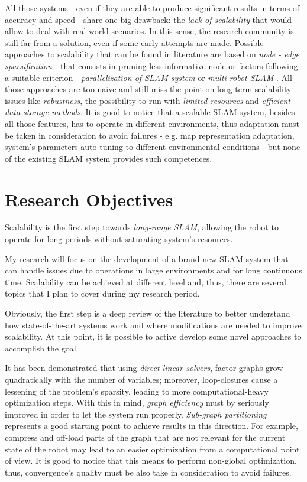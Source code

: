 \documentclass[10pt,a4paper, notitlepage]{report}
\begin{document}
All those systems - even if they are able to produce significant results in terms of accuracy and speed - share one big drawback: the \textit{lack of scalability} that would allow to deal with real-world scenarios. In this sense, the research community is still far from a solution, even if some early attempts are made. Possible approaches to scalability that can be found in literature are based on \textit{node - edge sparsification} \cite{kretzschmar2011graph-pruninig} \cite{huang2013consistent} - that consists in pruning less informative node or factors following a suitable criterion - \textit{parallelization of SLAM system} \cite{ni-dallaert2010nested-dissections} \cite{ni-dallaert2007tectonicSAM} \cite{grisetti2010hogman} or \textit{multi-robot SLAM} \cite{cunningham2013ddfSAM2} \cite{lazaro2013mr-slam}. All those approaches are too naive and still miss the point on long-term scalability issues like \textit{robustness}, the possibility to run with \textit{limited resources} and \textit{efficient data storage methods}. It is good to notice that a scalable SLAM system, besides all those features, has to operate in different environments, thus adaptation must be taken in consideration to avoid failures - e.g. map representation adaptation, system's parameters auto-tuning to different environmental conditions - but none of the existing SLAM system provides such competences.

\section*{Research Objectives}
Scalability is the first step towards \textit{long-range SLAM}, allowing the robot to operate for long periods without saturating system's resources. 

My research will focus on the development of a brand new SLAM system that can handle issues due to operations in large environments and for long continuous time. Scalability can be achieved at different level and, thus, there are several topics that I plan to cover during my research period.

Obviously, the first step is a deep review of the literature to better understand how state-of-the-art systems work and where modifications are needed to improve scalability. At this point, it is possible to active develop some novel approaches to accomplish the goal.

It has been demonstrated that using \textit{direct linear solvers}, factor-graphs grow quadratically with the number of variables; moreover, loop-closures cause a lessening of the problem's sparsity, leading to more computational-heavy optimization steps. With this in mind, \textit{graph efficiency} must by seriously improved in order to let the system run properly. \textit{Sub-graph partitioning} \cite{grisetti2012condensed-m} represents a good starting point to achieve results in this direction. For example, compress and off-load parts of the graph that are not relevant for the current state of the robot may lead to an easier optimization from a computational point of view. It is good to notice that this means to perform non-global optimization, thus, convergence's quality must be also take in consideration to avoid failures.
\end{document}
